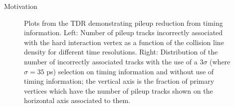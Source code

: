 \begin{section}{Motivation}
\begin{figure}[htb]
\begin{center}
\quad
{}
\end{center}
\caption{Plots from the TDR\cite{cite-mtd-tdr} demonstrating pileup reduction from timing information. Left: Number of pileup tracks incorrectly associated with the hard interaction vertex as a function of the collision line density for different time resolutions. Right: Distribution of the number of incorrectly associated tracks with the use of a $3\sigma$ (where $\sigma = 35$ ps) selection on timing information and without use of timing information; the vertical axis is the fraction of primary vertices which have the number of pileup tracks shown on the horizontal axis
associated to them.}
\label{fig:pileup-reduce}
\end{figure}

\end{section}

